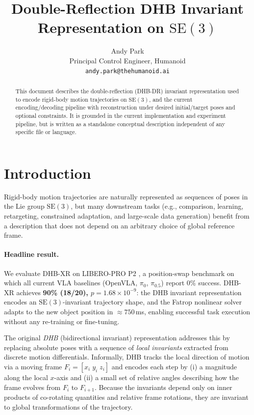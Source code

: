 \documentclass[11pt]{article}
\title{Double-Reflection DHB Invariant Representation on $\mathrm{SE}(3)$}
\author{Andy Park\\Principal Control Engineer, Humanoid\\\texttt{andy.park@thehumanoid.ai}}
\date{}
\begin{document}
\maketitle

\begin{abstract}
  This document describes the double-reflection (DHB-DR) invariant representation used to encode rigid-body motion trajectories on $\mathrm{SE}(3)$, and the current encoding/decoding pipeline with reconstruction under desired initial/target poses and optional constraints. It is grounded in the current implementation and experiment pipeline, but is written as a standalone conceptual description independent of any specific file or language.
\end{abstract}

\section{Introduction}
Rigid-body motion trajectories are naturally represented as sequences of poses in the Lie group $\mathrm{SE}(3)$, but many downstream tasks (e.g., comparison, learning, retargeting, constrained adaptation, and large-scale data generation) benefit from a description that does not depend on an arbitrary choice of global reference frame.

\paragraph{Headline result.}
We evaluate DHB-XR on LIBERO-PRO P2 \cite{zhu2025liberopro}, a position-swap benchmark on which all current VLA baselines (OpenVLA, $\pi_0$, $\pi_{0.5}$) report 0\% success.
DHB-XR achieves \textbf{90\% (18/20), $p = 1.68 \times 10^{-9}$}: the DHB invariant representation encodes an $\mathrm{SE}(3)$-invariant trajectory shape, and the Fatrop nonlinear solver adapts to the new object position in ${\approx}750$\,ms, enabling successful task execution without any re-training or fine-tuning.

The original \emph{DHB} (bidirectional invariant) representation \cite{soloperto2015icra,lee2018autonomous} addresses this by replacing absolute poses with a sequence of \emph{local invariants} extracted from discrete motion differentials. Informally, DHB tracks the local direction of motion via a moving frame $F_i = [x_i\; y_i\; z_i]$ and encodes each step by (i) a magnitude along the local $x$-axis and (ii) a small set of relative angles describing how the frame evolves from $F_i$ to $F_{i+1}$. Because the invariants depend only on inner products of co-rotating quantities and relative frame rotations, they are invariant to global transformations of the trajectory.
\end{document}
